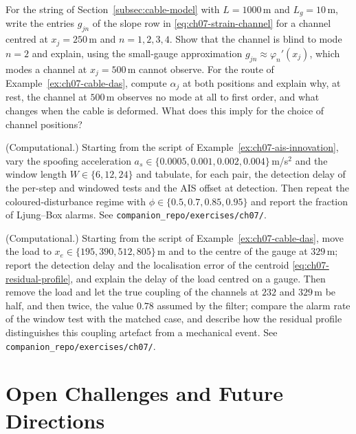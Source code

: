 \documentclass[graybox,envcountchap]{style/SNmono}
\newcommand{\repopath}[1]{\texttt{#1}}
\begin{document}
\begin{prob}\label{prob:ch07:5}
For the string of Section~\ref{subsec:cable-model} with $L=1000$\,m and $L_g=10$\,m, write the entries $g_{jn}$ of the slope row in \eqref{eq:ch07-strain-channel} for a channel centred at $x_j=250$\,m and $n=1,2,3,4$. Show that the channel is blind to mode $n=2$ and explain, using the small-gauge approximation $g_{jn}\approx\varphi_n'(x_j)$, which modes a channel at $x_j=500$\,m cannot observe. For the route of Example~\ref{ex:ch07-cable-das}, compute $\alpha_j$ at both positions and explain why, at rest, the channel at $500$\,m observes no mode at all to first order, and what changes when the cable is deformed. What does this imply for the choice of channel positions?
\end{prob}
\begin{prob}\label{prob:ch07:6}
(Computational.) Starting from the script of Example~\ref{ex:ch07-ais-innovation}, vary the spoofing acceleration $a_s\in\{0.0005,0.001,0.002,0.004\}$\,m/s$^{2}$ and the window length $W\in\{6,12,24\}$ and tabulate, for each pair, the detection delay of the per-step and windowed tests and the AIS offset at detection. Then repeat the coloured-disturbance regime with $\phi\in\{0.5,0.7,0.85,0.95\}$ and report the fraction of Ljung--Box alarms. See \repopath{companion\_\allowbreak repo/\allowbreak exercises/\allowbreak ch07/\allowbreak }.
\end{prob}
\begin{prob}\label{prob:ch07:7}
(Computational.) Starting from the script of Example~\ref{ex:ch07-cable-das}, move the load to $x_e\in\{195,390,512,805\}$\,m and to the centre of the gauge at $329$\,m; report the detection delay and the localisation error of the centroid \eqref{eq:ch07-residual-profile}, and explain the delay of the load centred on a gauge. Then remove the load and let the true coupling of the channels at $232$ and $329$\,m be half, and then twice, the value $0.78$ assumed by the filter; compare the alarm rate of the window test with the matched case, and describe how the residual profile distinguishes this coupling artefact from a mechanical event. See \repopath{companion\_\allowbreak repo/\allowbreak exercises/\allowbreak ch07/\allowbreak }.
\end{prob}


\clearpage

\clearpage

\chapter{Open Challenges and Future Directions}
\label{sec:open-challenges}
\end{document}
